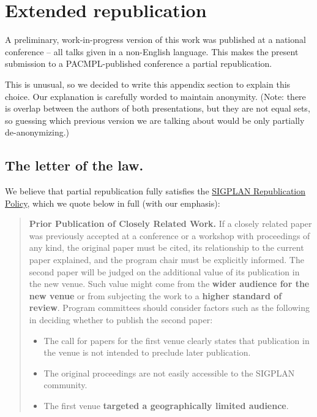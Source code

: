 \section{Extended republication}
\label{app:extended-republication}

A preliminary, work-in-progress version of this work was published at
a national conference -- all talks given in a non-English
language. This makes the present submission to a PACMPL-published
conference a partial republication.

This is unusual, so we decided to write this appendix section to
explain this choice. Our explanation is carefully worded to maintain
anonymity. (Note: there is overlap between the authors of both
presentations, but they are not equal sets, so guessing which previous
version we are talking about would be only partially de-anonymizing.)

\subsection{The letter of the law.}

We believe that partial republication fully satisfies the
\href{http://www.sigplan.org/Resources/Policies/Republication/}{SIGPLAN
  Republication Policy}, which we quote below in full
(with our emphasis):

\begin{quote}
  \textbf{Prior Publication of Closely Related Work.}  If a closely
  related paper was previously accepted at a conference or a workshop
  with proceedings of any kind, the original paper must be cited, its
  relationship to the current paper explained, and the program chair
  must be explicitly informed. The second paper will be judged on the
  additional value of its publication in the new venue. Such value
  might come from the \textbf{wider audience for the new venue} or
  from subjecting the work to a \textbf{higher standard of
    review}. Program committees should consider factors such as the
  following in deciding whether to publish the second paper:
    \begin{itemize}
    \item The call for papers for the first venue clearly states that publication in the venue is not intended to preclude later publication.
    \item The original proceedings are not easily accessible to the SIGPLAN community.
    \item The first venue \textbf{targeted a geographically limited audience}.
    \end{itemize}
\end{quote}

